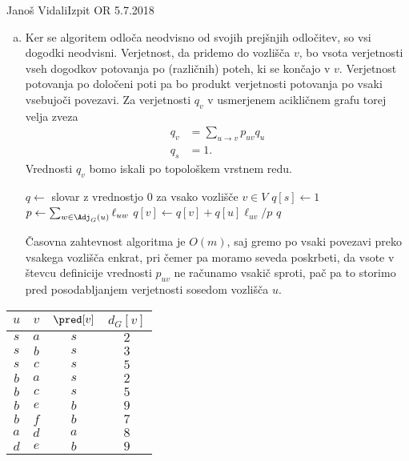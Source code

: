 \begin{naloga}{Janoš Vidali}{Izpit OR 5.7.2018}
\begin{odgovor}
\begin{enumerate}[(a)]
\item Ker se algoritem odloča neodvisno od svojih prejšnjih odločitev,
so vsi dogodki neodvisni.
Verjetnost, da pridemo do vozlišča $v$,
bo vsota verjetnosti vseh dogodkov potovanja po (različnih) poteh,
ki se končajo v $v$.
Verjetnost potovanja po določeni poti pa bo produkt verjetnosti potovanja po vsaki vsebujoči povezavi.
Za verjetnosti $q_v$ v usmerjenem acikličnem grafu torej velja zveza
\begin{align*}
q_v &= \sum_{u \rightarrow v}p_{uv} q_u \\
q_s &= 1.
\end{align*}
Vrednosti $q_v$ bomo iskali po topološkem vrstnem redu.
\begin{small}
\begin{algorithmic}
	\State $q \gets$ slovar z vrednostjo $0$ za vsako vozlišče $v \in V$
	\State $q[s] \gets 1$
        \State $p \gets \sum_{w \in \Adj_G(u)} \ell_{uw}$
			\State $q[v] \gets q[v] + q[u] \ell_{uv} / p$
		\EndFor
	\EndFor
    \State \Return $q$
\EndFunction
\end{algorithmic}
\end{small}
Časovna zahtevnost algoritma je $O(m)$, 
saj gremo po vsaki povezavi preko vsakega vozlišča enkrat, 
pri čemer pa moramo seveda poskrbeti,
da vsote v števcu definicije vrednosti $p_{uv}$ ne računamo vsakič sproti,
pač pa to storimo pred posodabljanjem verjetnosti sosedom vozlišča $u$.
\end{enumerate}
%
\begin{slika}[p]
\end{slika}
%
\begin{tabela}[p]
\begin{tabular}{cc|cc}
$u$ & $v$ & $\pred[v]$ & $d_G[v]$ \\ \hline
$ s$ & $a$ & $s$ & $2$ \\
$ s$ & $b$ & $s$ & $3$ \\
$ s$ & $c$ & $s$ & $5$ \\
$ b$ & $a$ & $s$ & $2$ \\
$ b$ & $c$ & $s$ & $5$ \\
$ b$ & $e$ & $b$ & $9$ \\
$ b$ & $f$ & $b$ & $7$ \\
$ a$ & $d$ & $a$ & $8$ \\
$ d$ & $e$ & $b$ & $9$ \\

\end{tabular}
\end{tabela}
\end{odgovor}
\end{naloga}
